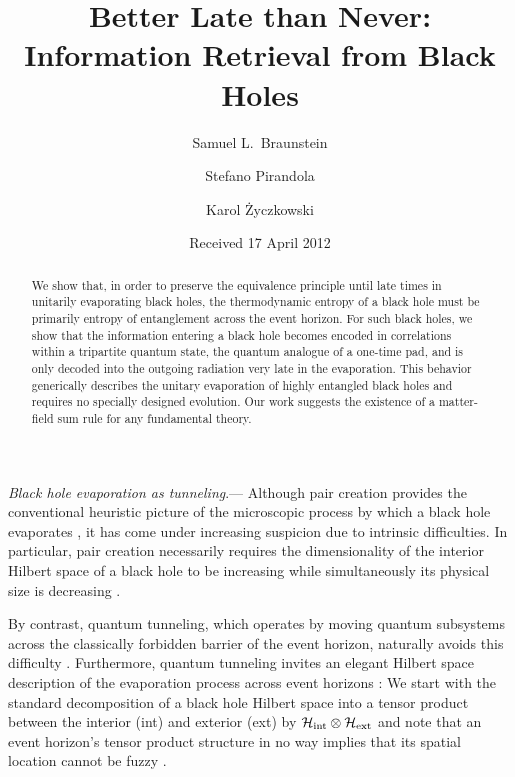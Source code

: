 \documentclass[aps,showpacs,prl,12pt]{revtex4}
\begin{document}
\title{Better Late than Never: Information Retrieval from Black Holes}
\author{Samuel L.\ Braunstein}
\author{Stefano Pirandola}
\author{Karol \.{Z}yczkowski}
\date{Received 17 April 2012}

\begin{abstract}
We show that, in order to preserve the equivalence principle until late
times in unitarily evaporating black holes, the thermodynamic entropy of
a black hole must be primarily entropy of entanglement across the event
horizon. For such black holes, we show that the information entering
a black hole becomes encoded in correlations within a tripartite
quantum state, the quantum analogue of a one-time pad, and is only
decoded into the outgoing radiation very late in the evaporation.
This behavior generically describes the unitary evaporation of highly
entangled black holes and requires no specially designed evolution.
Our work suggests the existence of a matter-field sum rule for any
fundamental theory.
\end{abstract}


\maketitle

{\it Black hole evaporation as tunneling}.---%
Although pair creation provides the conventional heuristic picture of
the microscopic process by which a black hole evaporates
\cite{Hawking75}, it has come under increasing suspicion due to intrinsic
difficulties. In particular, pair creation necessarily requires the
dimensionality of the interior Hilbert space of a black hole to
be increasing while simultaneously its physical size is
decreasing \cite{Nikolic,B10}.

By contrast, quantum tunneling, which operates by moving quantum
subsystems across the classically forbidden barrier of the event
horizon, naturally avoids this difficulty \cite{B10}. Furthermore,
quantum tunneling invites an elegant Hilbert space description of the
evaporation process across event horizons \cite{B10}: We start
with the standard decomposition of a black hole Hilbert space into a
tensor product between the interior (int) and exterior (ext) by
${\cal H}_{\text{int}}\otimes{\cal H}_{\text{ext}}$ \cite{Hawking76}
and note that an event horizon's tensor product structure in no
way implies that its spatial location cannot be fuzzy \cite{B10}.
\end{document}
